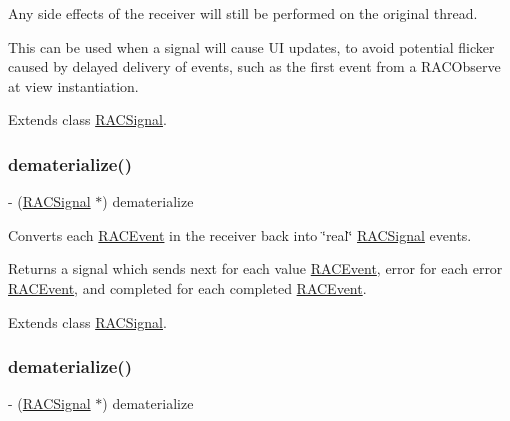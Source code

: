 Any side effects of the receiver will still be performed on the original thread.

This can be used when a signal will cause UI updates, to avoid potential flicker caused by delayed delivery of events, such as the first event from a R\+A\+C\+Observe at view instantiation. 

Extends class \mbox{\hyperlink{interface_r_a_c_signal_a0c7042ce0eb6c729bc38421295296db1}{R\+A\+C\+Signal}}.

\mbox{\label{category_r_a_c_signal_07_operations_08_aa5b197f63d89c698c8cbfc749ea15440}} 
\subsubsection{\texorpdfstring{dematerialize()}{dematerialize()}\hspace{0.1cm}{\footnotesize\ttfamily [1/3]}}
{\footnotesize\ttfamily -\/ (\mbox{\hyperlink{interface_r_a_c_signal}{R\+A\+C\+Signal}} $\ast$) dematerialize \begin{DoxyParamCaption}{ }\end{DoxyParamCaption}}

Converts each \mbox{\hyperlink{interface_r_a_c_event}{R\+A\+C\+Event}} in the receiver back into \char`\"{}real\char`\"{} \mbox{\hyperlink{interface_r_a_c_signal}{R\+A\+C\+Signal}} events.

Returns a signal which sends {\ttfamily next} for each value \mbox{\hyperlink{interface_r_a_c_event}{R\+A\+C\+Event}}, {\ttfamily error} for each error \mbox{\hyperlink{interface_r_a_c_event}{R\+A\+C\+Event}}, and {\ttfamily completed} for each completed \mbox{\hyperlink{interface_r_a_c_event}{R\+A\+C\+Event}}. 

Extends class \mbox{\hyperlink{interface_r_a_c_signal_aa5b197f63d89c698c8cbfc749ea15440}{R\+A\+C\+Signal}}.

\mbox{\label{category_r_a_c_signal_07_operations_08_aa5b197f63d89c698c8cbfc749ea15440}} 
\subsubsection{\texorpdfstring{dematerialize()}{dematerialize()}\hspace{0.1cm}{\footnotesize\ttfamily [2/3]}}
{\footnotesize\ttfamily -\/ (\mbox{\hyperlink{interface_r_a_c_signal}{R\+A\+C\+Signal}} $\ast$) dematerialize \begin{DoxyParamCaption}{ }\end{DoxyParamCaption}}

